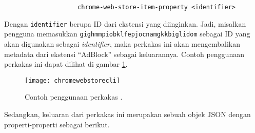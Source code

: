 \begin{verbatim}
                    chrome-web-store-item-property <identifier>
\end{verbatim}

Dengan \verb|identifier| berupa ID dari ekstensi yang diinginkan. Jadi, misalkan pengguna memasukkan \verb|gighmmpiobklfepjocnamgkkbiglidom| sebagai ID yang akan digunakan sebagai \textit{identifier}, maka perkakas ini akan mengembalikan metadata dari ekstensi ``AdBlock'' sebagai keluarannya. Contoh penggunaan perkakas ini dapat dilihat di gambar \ref{fig:similarapps-chromewebstorecli}.

\begin{figure}[ht]
    \centering
    \texttt{[image: chromewebstorecli]}
    \caption[Contoh penggunaan perkakas \chromewebstorecli]{Contoh penggunaan perkakas \chromewebstorecli.}
    \label{fig:similarapps-chromewebstorecli}
\end{figure}

Sedangkan, keluaran dari perkakas ini merupakan sebuah objek JSON dengan properti-properti sebagai berikut.

